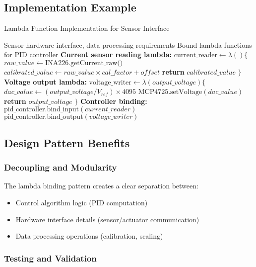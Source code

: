 \documentclass{article}
\begin{document}
\subsection{Implementation Example}

\begin{algorithm}
\caption{Lambda Function Implementation for Sensor Interface}
\label{alg:lambda_implementation}
\begin{algorithmic}[1]
\REQUIRE Sensor hardware interface, data processing requirements
\ENSURE Bound lambda functions for PID controller
\STATE \textbf{Current sensor reading lambda:}
\STATE $\text{current\_reader} \leftarrow \lambda() \{$
\STATE \quad $raw\_value \leftarrow \text{INA226.getCurrent\_raw()}$
\STATE \quad $calibrated\_value \leftarrow raw\_value \times cal\_factor + offset$
\STATE \quad \textbf{return} $calibrated\_value$
\STATE $\}$
\STATE
\STATE \textbf{Voltage output lambda:}
\STATE $\text{voltage\_writer} \leftarrow \lambda(output\_voltage) \{$
\STATE \quad $dac\_value \leftarrow (output\_voltage / V_{ref}) \times 4095$
\STATE \quad $\text{MCP4725.setVoltage}(dac\_value)$
\STATE \quad \textbf{return} $output\_voltage$
\STATE $\}$
\STATE
\STATE \textbf{Controller binding:}
\STATE $\text{pid\_controller.bind\_input}(current\_reader)$
\STATE $\text{pid\_controller.bind\_output}(voltage\_writer)$
\end{algorithmic}
\end{algorithm}

\subsection{Design Pattern Benefits}

\subsubsection{Decoupling and Modularity}

The lambda binding pattern creates a clear separation between:
\begin{itemize}
    \item Control algorithm logic (PID computation)
    \item Hardware interface details (sensor/actuator communication)
    \item Data processing operations (calibration, scaling)
\end{itemize}

\subsubsection{Testing and Validation}
\end{document}
